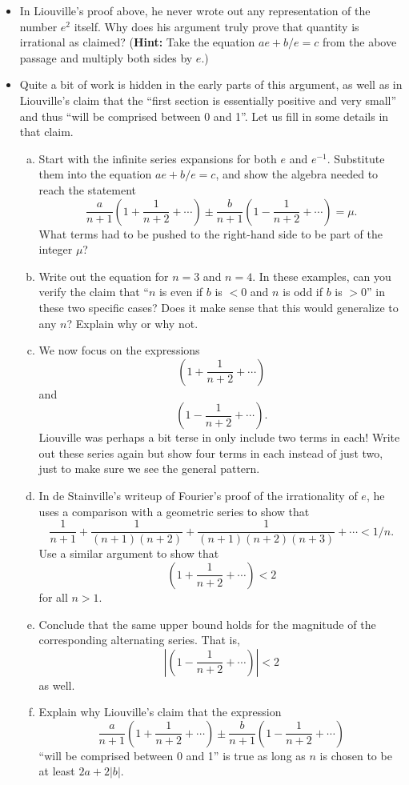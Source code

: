 \documentclass[11pt]{article}
\newcounter{tasknumb}
\newcommand{\tasknumb}[1]{\refstepcounter{tasknumb}\textmd{\textbf{$\fbox{$\fbox{Task \thetasknumb}$}$}}#1}
\newenvironment{task}[1][]%
 {\begin{itemize}
 \item[\tasknumb{#1}]  }
{
    \end{itemize}    }%
\begin{document}
\begin{task}
 In Liouville's proof above, he never wrote out any representation of the number $e^2$ itself.  Why does his argument truly prove that quantity is irrational as claimed?  ({\bf Hint:} Take the equation  $ae+b/e=c$ from the above passage and multiply both sides by $e$.)
\end{task}

\begin{task}  Quite a bit of work is hidden in the early parts of this argument, as well as in Liouville's claim that the ``{\sf first section is essentially positive and very small}'' and thus ``{\sf will be comprised between 0 and 1}''.  Let us fill in some details in that claim.
\begin{enumerate}[(a)]
    \item Start with the infinite series expansions for both $e$ and $e^{-1}$.  Substitute them into the equation $ae+b/e=c$, and show the algebra needed to reach the statement $$ \frac{a}{n+1}\left(1+\frac{1}{n+2}+\cdots \right)\pm \frac{b}{n+1}\left(1-\frac{1}{n+2}+\cdots \right)=\mu.$$  What terms had to be pushed to the right-hand side to be part of the integer $\mu$?
    \item Write out the equation for $n=3$ and $n=4$.  In these examples, can you verify the claim that ``{\sf $n$ is even if $b$ is $<0$ and $n$ is odd if $b$ is $>0$}'' in these two specific cases?  Does it make sense that this would generalize to any $n$?  Explain why or why not.
    \item We now focus on the expressions $$\left(1+\frac{1}{n+2}+\cdots \right)$$ and $$\left(1-\frac{1}{n+2}+\cdots \right).$$  Liouville was perhaps a bit terse in only include two terms in each!  Write out these series again but show four terms in each instead of just two, just to make sure we see the general pattern.
    \item In de Stainville's writeup of Fourier's proof of the irrationality of $e$, he uses a comparison with a geometric series to show that $$\frac{1}{n+1}+\frac{1}{(n+1)(n+2)}+\frac{1}{(n+1)(n+2)(n+3)}+\cdots < 1/n.$$  Use a similar argument to show that $$\left(1+\frac{1}{n+2}+\cdots \right)<2$$ for all $n>1.$
    \item Conclude that the same upper bound holds for the magnitude of the corresponding alternating series.  That is, $$\left| \left(1-\frac{1}{n+2}+\cdots \right)\right|<2$$ as well.
    \item Explain why Liouville's claim that the expression $$\frac{a}{n+1}\left(1+\frac{1}{n+2}+\cdots \right)\pm \frac{b}{n+1}\left(1-\frac{1}{n+2}+\cdots \right)$$  ``{\sf will be comprised between 0 and 1}'' is true as long as $n$ is chosen to be at least $2a+2|b|$.
\end{enumerate}
\end{task}
\end{document}
